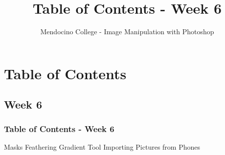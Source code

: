 \documentclass{beamer}
\title{Table of Contents - Week 6}
\author{Mendocino College - Image Manipulation with Photoshop}
\date{\vspace{-5em}}
\begin{document}
	{
		\begin{frame}
			\vspace{-35pt}
			\maketitle
		\end{frame}
	}

	\section{Table of Contents}

	
			\subsection{Week 6}		
	\begin{frame}
		\frametitle{Table of Contents - Week 6}
	\begin{outline}
		\1 Masks
		\1 Feathering
		\1 Gradient Tool
		\1 Importing Pictures from Phones
	\end{outline}
		\end{frame}
	
\end{document}
